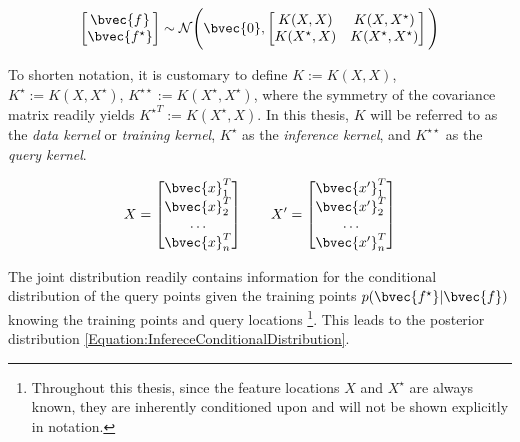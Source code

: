 			\begin{equation}
				\begin{bmatrix}
					\bvec{f^{ }} \\ \bvec{f^{\star}}
				\end{bmatrix}
				\sim \mathcal{N}\Bigg(\bvec{0}, \begin{bmatrix}
													K(X, X) & K(X, X^{\star}) \\
													K(X^{\star}, X) & K(X^{\star}, X^{\star}) \\
												\end{bmatrix}  \Bigg)
			\label{Equation:InferenceJointDistribution}
			\end{equation}
			
			
			To shorten notation, it is customary to define $K := K(X, X)$, $K^{\star} := K(X, X^{\star})$, $K^{\star \star} := K(X^{\star}, X^{\star})$, where the symmetry of the covariance matrix readily yields ${K^{\star}}^{T} := K(X^{\star}, X)$. In this thesis, $K$ will be referred to as the \textit{data kernel} or \textit{training kernel}, $K^{\star}$ as the \textit{inference kernel}, and $K^{\star \star}$ as the \textit{query kernel}.
			
			\begin{equation}
				X = \begin{bmatrix}
					\bvec{x}_{1}^{T} \\ \bvec{x}_{2}^{T} \\ \dots \\ \bvec{x}_{n}^{T}
				\end{bmatrix} \qquad X' = \begin{bmatrix}
									\bvec{x'}_{1}^{T} \\ \bvec{x'}_{2}^{T} \\ \dots \\ \bvec{x'}_{n}^{T}
								\end{bmatrix}
			\label{Equation:TrainingQueryDataMatrices}
			\end{equation}	
				
			The joint distribution readily contains information for the conditional distribution of the query points given the training points $p(\bvec{f^{\star}} | \bvec{f})$ knowing the training points and query locations \footnote{Throughout this thesis, since the feature locations $X$ and $X^{\star}$ are always known, they are inherently conditioned upon and will not be shown explicitly in notation.}. This leads to the posterior distribution \eqref{Equation:InfereceConditionalDistribution}.
			

